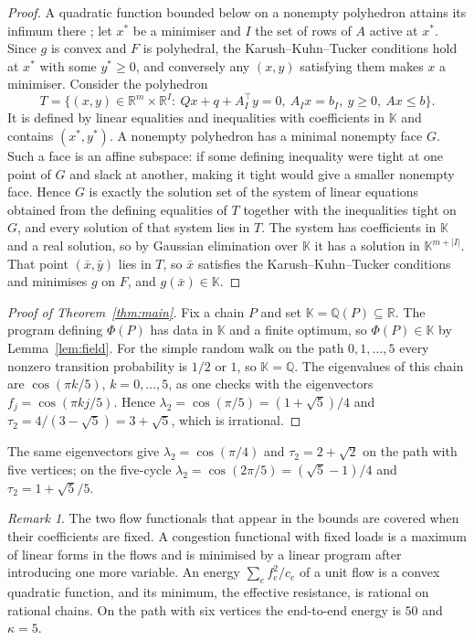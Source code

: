 \documentclass[11pt]{amsart}
\theoremstyle{remark}
\newtheorem{remark}[theorem]{Remark}
\numberwithin{equation}{section}
\newcommand{\Q}{\mathbb Q}
\newcommand{\R}{\mathbb R}
\newcommand{\K}{\mathbb K}
\begin{document}
\begin{proof}
A quadratic function bounded below on a nonempty polyhedron attains its infimum there \cite{FW}; let $x^*$ be a minimiser and $I$ the set of rows of $A$ active at $x^*$. Since $g$ is convex and $F$ is polyhedral, the Karush--Kuhn--Tucker conditions hold at $x^*$ with some $y^*\ge0$, and conversely any $(x,y)$ satisfying them makes $x$ a minimiser. Consider the polyhedron
\[
T=\bigl\{(x,y)\in\R^m\times\R^I:\ Qx+q+A_I^\top y=0,\ A_Ix=b_I,\ y\ge0,\ Ax\le b\bigr\}.
\]
It is defined by linear equalities and inequalities with coefficients in $\K$ and contains $(x^*,y^*)$. A nonempty polyhedron has a minimal nonempty face $G$. Such a face is an affine subspace: if some defining inequality were tight at one point of $G$ and slack at another, making it tight would give a smaller nonempty face. Hence $G$ is exactly the solution set of the system of linear equations obtained from the defining equalities of $T$ together with the inequalities tight on $G$, and every solution of that system lies in $T$. The system has coefficients in $\K$ and a real solution, so by Gaussian elimination over $\K$ it has a solution in $\K^{m+|I|}$. That point $(\bar x,\bar y)$ lies in $T$, so $\bar x$ satisfies the Karush--Kuhn--Tucker conditions and minimises $g$ on $F$, and $g(\bar x)\in\K$.
\end{proof}

\begin{proof}[Proof of Theorem~\ref{thm:main}]
Fix a chain $P$ and set $\K=\Q(P)\subseteq\R$. The program defining $\Phi(P)$ has data in $\K$ and a finite optimum, so $\Phi(P)\in\K$ by Lemma~\ref{lem:field}. For the simple random walk on the path $0,1,\dots,5$ every nonzero transition probability is $1/2$ or $1$, so $\K=\Q$. The eigenvalues of this chain are $\cos(\pi k/5)$, $k=0,\dots,5$, as one checks with the eigenvectors $f_j=\cos(\pi kj/5)$. Hence $\lambda_2=\cos(\pi/5)=(1+\sqrt5)/4$ and $\tau_2=4/(3-\sqrt5)=3+\sqrt5$, which is irrational.
\end{proof}

The same eigenvectors give $\lambda_2=\cos(\pi/4)$ and $\tau_2=2+\sqrt2$ on the path with five vertices; on the five-cycle $\lambda_2=\cos(2\pi/5)=(\sqrt5-1)/4$ and $\tau_2=1+\sqrt5/5$.

\begin{remark}
The two flow functionals that appear in the bounds are covered when their coefficients are fixed. A congestion functional with fixed loads is a maximum of linear forms in the flows and is minimised by a linear program after introducing one more variable. An energy $\sum_e f_e^2/c_e$ of a unit flow is a convex quadratic function, and its minimum, the effective resistance, is rational on rational chains. On the path with six vertices the end-to-end energy is $50$ and $\kappa=5$.
\end{remark}
\end{document}
